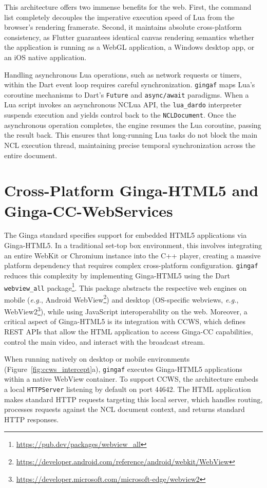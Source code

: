 \documentclass[sigconf]{webmedia}
\newcommand{\projectname}{\texttt{gingaf}}
\begin{document}
This architecture offers two immense benefits for the web. First, the command list completely decouples the imperative execution speed of Lua from the browser's rendering framerate. Second, it maintains absolute cross-platform consistency, as Flutter guarantees identical canvas rendering semantics whether the application is running as a WebGL application, a Windows desktop app, or an iOS native application.

Handling asynchronous Lua operations, such as network requests or timers, within the Dart event loop requires careful synchronization. \projectname{} maps Lua's coroutine mechanisms to Dart's \texttt{Future} and \texttt{async/await} paradigms. When a Lua script invokes an asynchronous NCLua API, the \texttt{lua\_dardo} interpreter suspends execution and yields control back to the \texttt{NCLDocument}. Once the asynchronous operation completes, the engine resumes the Lua coroutine, passing the result back. This ensures that long-running Lua tasks do not block the main NCL execution thread, maintaining precise temporal synchronization across the entire document.

\section{Cross-Platform Ginga-HTML5 and Ginga-CC-WebServices}
\label{sec:htmlccws}

The Ginga standard specifies support for embedded HTML5 applications via Ginga-HTML5. In a traditional set-top box environment, this involves integrating an entire WebKit or Chromium instance into the C++ player, creating a massive platform dependency that requires complex cross-platform configuration. \projectname{} reduces this complexity by implementing Ginga-HTML5 using the Dart \texttt{webview\_all} package\footnote{\url{https://pub.dev/packages/webview_all}}. This package abstracts the respective web engines on mobile (\textit{e.g.}, Android WebView\footnote{\url{https://developer.android.com/reference/android/webkit/WebView}}) and desktop (OS-specific webviews, \textit{e.g.}, WebView2\footnote{\url{https://developer.microsoft.com/microsoft-edge/webview2}}), while using JavaScript interoperability on the web. Moreover, a critical aspect of Ginga-HTML5 is its integration with CCWS, which defines REST APIs that allow the HTML application to access Ginga-CC capabilities, control the main video, and interact with the broadcast stream.

When running natively on desktop or mobile environments (Figure~\ref{fig:ccws_intercept}a), \projectname{} executes Ginga-HTML5 applications within a native WebView container. To support CCWS, the architecture embeds a local \texttt{HTTPServer} listening by default on port 44642. The HTML application makes standard HTTP requests targeting this local server, which handles routing, processes requests against the NCL document context, and returns standard HTTP responses.
\end{document}
